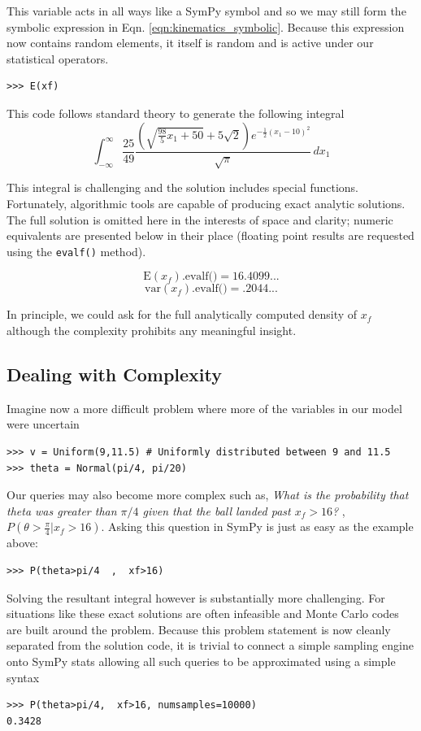 This variable acts in all ways like a SymPy symbol and so we may still form the
symbolic expression in Eqn. \ref{eqn:kinematics_symbolic}. 
Because this expression now contains random elements, it itself is random and is active under our statistical operators.

\begin{lstlisting}
>>> E(xf)
\end{lstlisting}

This code follows standard theory to generate the following integral
$$\int_{-\infty}^{\infty} \frac{25}{49} \frac{\left(\sqrt{\frac{98}{5} x_{1} + 50} + 5 \sqrt{2}\right) e^{- \frac{1}{2} \left(x_{1} -10\right)^{2}}}{\sqrt{\pi}}\, dx_{1}$$

This integral is challenging and the solution includes special
functions. Fortunately, algorithmic tools are capable of producing exact
analytic solutions. The full solution is omitted here in the interests of space and clarity; numeric equivalents are presented below in their place (floating point results are requested using the {\tt evalf()} method). 

$$\textrm{E}(x_f)\textrm{.evalf()} = 16.4099...$$
$$\textrm{var}(x_f)\textrm{.evalf()} = .2044...$$

In principle, we could ask for the full analytically computed density of $x_f$
although the complexity prohibits any meaningful insight.

\subsection{Dealing with Complexity}

Imagine now a more difficult problem where more of the variables in our model were uncertain
\begin{lstlisting}
>>> v = Uniform(9,11.5) # Uniformly distributed between 9 and 11.5
>>> theta = Normal(pi/4, pi/20)
\end{lstlisting}

Our queries may also become more complex such as, \textit{What is the
probability that theta was greater than $\pi/4$ given that the ball landed
past $x_f>16$?} , $P(\theta>\frac{\pi}{4} | x_f>16)$. Asking this question in
SymPy is just as easy as the example above:
\begin{lstlisting}
>>> P(theta>pi/4  ,  xf>16)
\end{lstlisting}
Solving the resultant integral however is substantially more challenging. For
situations like these exact solutions are often infeasible and Monte Carlo
codes are built around the problem. Because this problem statement is now
cleanly separated from the solution code, it is trivial to connect a simple
sampling engine onto SymPy stats allowing all such queries to be approximated
using a simple syntax
\begin{lstlisting}
>>> P(theta>pi/4,  xf>16, numsamples=10000)
0.3428
\end{lstlisting}


